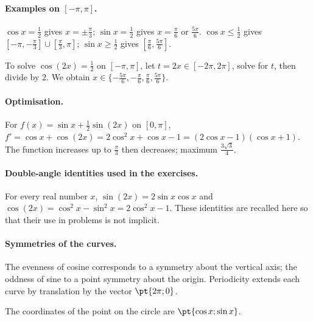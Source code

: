 \paragraph{Examples on $[-\pi,\pi]$.} $\cos x=\frac{1}{2}$ gives $x=\pm\frac{\pi}{3}$; $\sin x=\frac{1}{2}$ gives $x=\frac{\pi}{6}$ or $\frac{5\pi}{6}$. $\cos x\le\frac{1}{2}$ gives $[-\pi,-\frac{\pi}{3}]\cup[\frac{\pi}{3},\pi]$; $\sin x\ge\frac{1}{2}$ gives $[\frac{\pi}{6},\frac{5\pi}{6}]$.
\begin{method}
To solve $\cos (2x)=\frac{1}{2}$ on $[-\pi,\pi]$, let $t=2x\in[-2\pi,2\pi]$, solve for $t$, then divide by $2$. We obtain $x\in\{-\frac{5\pi}{6},-\frac{\pi}{6},\frac{\pi}{6},\frac{5\pi}{6}\}$.
\end{method}
\paragraph{Optimisation.} For $f(x)=\sin x+\frac12\sin(2x)$ on $[0,\pi]$, $f'=\cos x+\cos(2x)=2\cos^2x+\cos x-1=(2\cos x-1)(\cos x+1)$. The function increases up to $\frac{\pi}{3}$ then decreases; maximum $\frac{3\sqrt{3}}{4}$.
\paragraph{Double-angle identities used in the exercises.} For every real number $x$, $\sin(2x)=2\sin x\cos x$ and $\cos(2x)=\cos^2x-\sin^2x=2\cos^2x-1$. These identities are recalled here so that their use in problems is not implicit.
\paragraph{Symmetries of the curves.} The evenness of cosine corresponds to a symmetry about the vertical axis; the oddness of sine to a point symmetry about the origin. Periodicity extends each curve by translation by the vector $\pt{2\pi;0}$.


\begin{center}\par\small The coordinates of the point on the circle are $\pt{\cos x;\sin x}$.\end{center}

